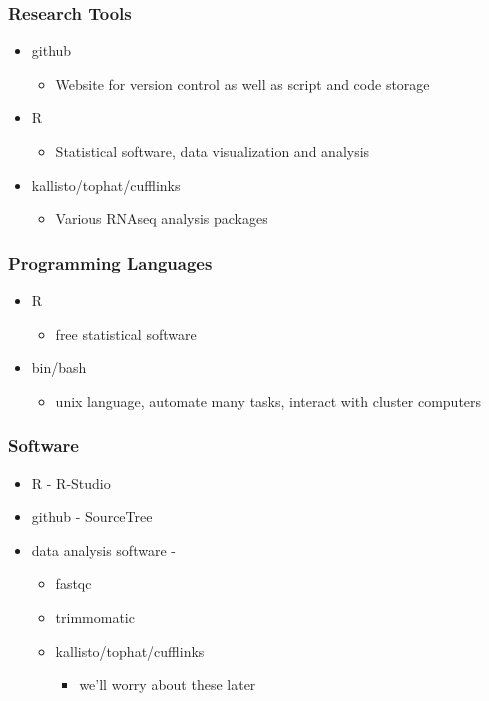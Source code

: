 \documentclass[14pt]{beamer}
\begin{document}
\begin{frame}
\frametitle{Research Tools}
\begin{itemize}
	\item<1-> github
	\begin{itemize}
	\item<1-> Website for version control as well as script and code storage
	\end{itemize}

	\item<2-> R
	\begin{itemize}
	\item<2-> Statistical software, data visualization and analysis
	\end{itemize}
	
	\item<3-> kallisto/tophat/cufflinks
	\begin{itemize}
	\item<3-> Various RNAseq analysis packages
	\end{itemize}
	
\end{itemize}
\end{frame}

\begin{frame}
\frametitle{Programming Languages}
\begin{itemize}
	\item R
	\begin{itemize}
		\item free statistical software
	\end{itemize}
	\item bin/bash
	\begin{itemize}
		\item unix language, automate many tasks, interact with cluster computers
	\end{itemize}
\end{itemize}
\end{frame}

\begin{frame}
\frametitle{Software}
\begin{itemize}
	\item<1-> R - R-Studio
	\item<2-> github - SourceTree
	\item<3-> data analysis software - 
	\begin{itemize}
		\item fastqc
		\item trimmomatic
		\item kallisto/tophat/cufflinks
		\begin{itemize}
			\item we'll worry about these later
		\end{itemize}
	\end{itemize}
\end{itemize}
\end{frame}
\end{document}
